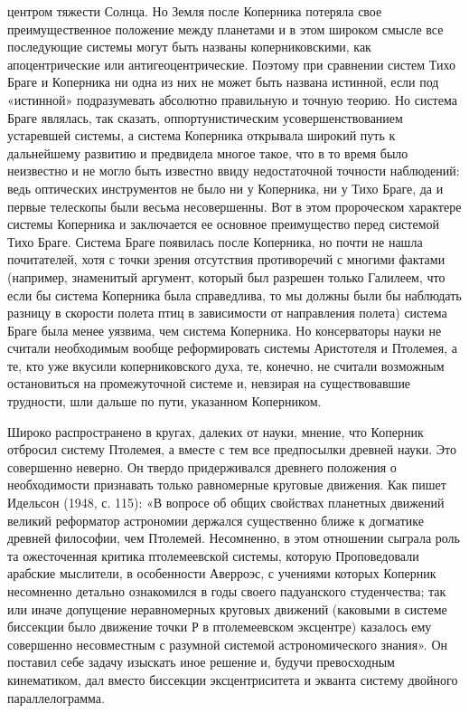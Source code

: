 центром тяжести Солнца. Но Земля после Коперника потеряла свое
преимущественное положение между планетами и в этом широком смысле все
последующие системы могут быть названы коперниковскими, как
апоцентрические или антигеоцентрические. Поэтому при сравнении систем
Тихо Браге и Коперника ни одна из них не может быть названа истинной,
если под «истинной» подразумевать абсолютно правильную и точную
теорию. Но система Браге являлась, так сказать, оппортунистическим
усовершенствованием устаревшей системы, а система Коперника открывала
широкий путь к дальнейшему развитию и предвидела многое такое, что в
то время было неизвестно и не могло быть известно ввиду недостаточной
точности наблюдений: ведь оптических инструментов не было ни у
Коперника, ни у Тихо Браге, да и первые телескопы были весьма
несовершенны. Вот в этом пророческом характере системы Коперника и
заключается ее основное преимущество перед системой Тихо Браге.
Система Браге появилась после Коперника, но почти не нашла
почитателей, хотя с точки зрения отсутствия противоречий с многими
фактами (например, знаменитый аргумент, который был разрешен только
Галилеем, что если бы система Коперника была справедлива, то мы должны
были бы наблюдать разницу в скорости полета птиц в зависимости от
направления полета) система Браге была менее уязвима, чем система
Коперника. Но консерваторы науки не считали необходимым вообще
реформировать системы Аристотеля и Птолемея, а те, кто уже вкусили
коперниковского духа, те, конечно, не считали возможным остановиться
на промежуточной системе и, невзирая на существовавшие трудности, шли
дальше по пути, указанном Коперником.

Широко распространено в кругах, далеких от науки, мнение, что Коперник
отбросил систему Птолемея, а вместе с тем все предпосылки древней
науки. Это совершенно неверно. Он твердо придерживался древнего
положения о необходимости признавать только равномерные круговые
движения. Как пишет Идельсон (1948, с. 115): «В вопросе об общих
свойствах планетных движений великий реформатор астрономии держался
существенно ближе к догматике древней философии, чем Птолемей.
Несомненно, в этом отношении сыграла роль та ожесточенная критика
птолемеевской системы, которую Проповедовали арабские мыслители, в
особенности Аверроэс, с учениями которых Коперник несомненно детально
ознакомился в годы своего падуанского студенчества; так или иначе
допущение неравномерных круговых движений (каковыми в системе
биссекции было движение точки Р в птолемеевском эксцентре) казалось
ему совершенно несовместным с разумной системой астрономического
знания». Он поставил себе задачу изыскать иное решение и, будучи
превосходным кинематиком, дал вместо биссекции эксцентриситета и
экванта систему двойного параллелограмма.

